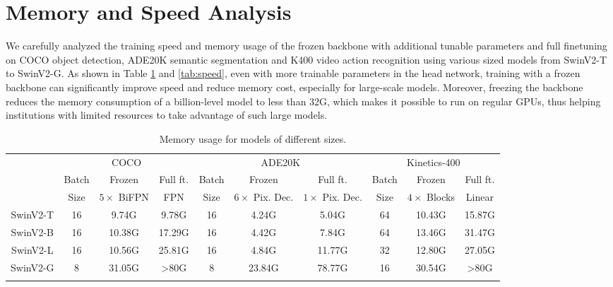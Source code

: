 \documentclass{article}
\begin{document}
\newpage





\newpage
\appendix

\section{Memory and Speed Analysis}
We carefully analyzed the training speed and memory usage of the frozen backbone with additional tunable parameters and full finetuning on COCO object detection, ADE20K semantic segmentation and K400 video action recognition using various sized models from SwinV2-T to SwinV2-G. As shown in Table \ref{tab:memory} and \ref{tab:speed}, even with more trainable parameters in the head network, training with a frozen backbone can significantly improve speed and reduce memory cost, especially for large-scale models. Moreover, freezing the backbone reduces the memory consumption of a billion-level model to less than 32G, which makes it possible to run on regular GPUs, thus helping institutions with limited resources to take advantage of such large models.
\begin{table}[htb]
        \centering
        \small
        \addtolength{\tabcolsep}{-2.5pt}
        \begin{tabular}{c|ccc|ccc|ccc}
            \Xhline{1.0pt}
            \multirow{3}{*}{Base Network} & \multicolumn{3}{c|}{COCO} & \multicolumn{3}{c|}{ADE20K} & \multicolumn{3}{c}{Kinetics-400}\\
            & Batch & Frozen & Full ft. & Batch & Frozen & Full ft. & Batch & Frozen & Full ft. \\
            & Size & $5\times$ BiFPN & FPN & Size & $6\times$ Pix. Dec. & $1\times$ Pix. Dec. & Size & $4\times$  Blocks & Linear \\
            \hline
            SwinV2-T & 16 & 9.74G & 9.78G & 16 & 4.24G & 5.04G & 64 & 10.43G & 15.87G \\
            SwinV2-B & 16 & 10.38G & 17.29G & 16 & 4.42G & 7.84G & 64 & 13.46G & 31.47G \\
            SwinV2-L & 16 & 10.56G & 25.81G & 16 & 4.84G & 11.77G & 32 & 12.80G & 27.05G \\
            SwinV2-G & 8 & 31.05G & >80G & 8 & 23.84G & 78.77G & 16 & 30.54G & >80G \\
          \Xhline{1.0pt}  
       \end{tabular}
     \caption{Memory usage for models of different sizes.}
     \label{tab:memory}
\end{table}
\end{document}
